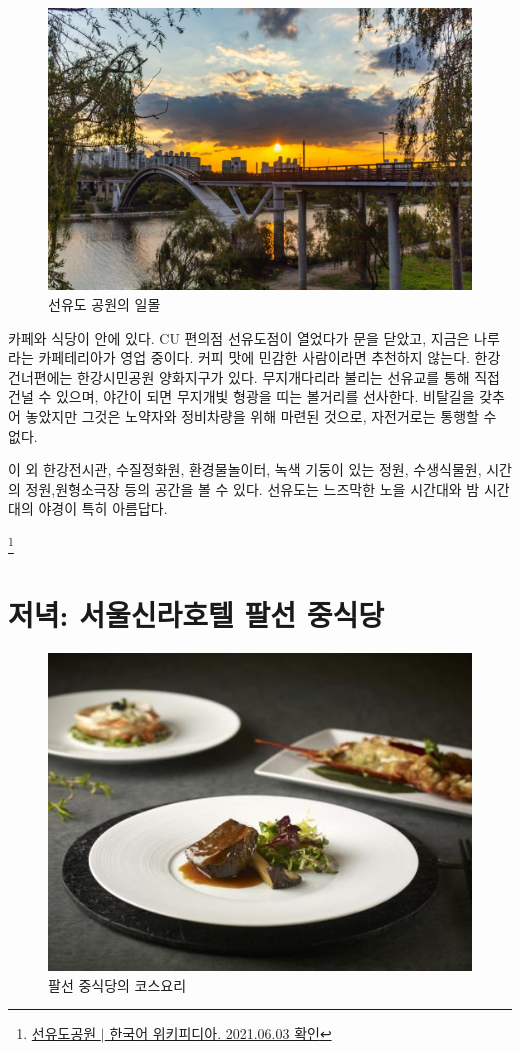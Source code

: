 \begin{figure}
    \centering
    \includegraphics[width=.6\textwidth]{e_img/ww_-006.jpg}
    \caption{선유도 공원의 일몰}
    \label{fig:haryu7}
\end{figure}

카페와 식당이 안에 있다. CU 편의점 선유도점이 열었다가 문을 닫았고, 지금은 
나루라는 카페테리아가 영업 중이다. 커피 맛에 민감한 사람이라면 추천하지 않는다. 한강 
건너편에는 한강시민공원 양화지구가 있다. 무지개다리라 불리는 선유교를 통해 직접 건널 수
있으며, 야간이 되면 무지개빛 형광을 띠는 볼거리를 선사한다. 비탈길을 갖추어 놓았지만
그것은 노약자와 정비차량을 위해 마련된 것으로, 자전거로는 통행할 수 없다.


이 외 한강전시관, 수질정화원, 환경물놀이터, 녹색 기둥이 있는 정원, 수생식물원,
시간의 정원,원형소극장 등의 공간을 볼 수 있다. 선유도는 느즈막한 노을 시간대와 밤 
시간대의 야경이 특히 아름답다.


\footnote{\href{https://ko.wikipedia.org/wiki/선유도공원}{선유도공원 $|$ 한국어 위키피디아. 2021.06.03 확인}}


\section{저녁: 서울신라호텔 팔선 중식당}


\begin{figure}
    \centering
    \includegraphics[width=.6\textwidth]{e_img/ww_-007.jpg}
    \caption{팔선 중식당의 코스요리}
    \label{fig:haryu8}
\end{figure}



